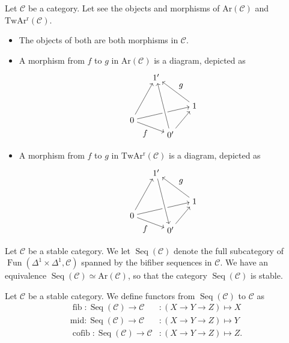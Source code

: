 \documentclass[a4paper,dvipdfmx,11pt,reqno]{amsart}
\DeclareMathOperator{\fib}{fib}
\DeclareMathOperator{\cofib}{cofib}
\renewcommand{\mid}{\mathrm{mid}}
\DeclareMathOperator{\Fun}{Fun}
\DeclareMathOperator{\Seq}{Seq}
\newcommand{\C}{\mathcal{C}}
\newcommand{\Ar}{\mathrm{Ar}}
\newcommand{\TwArr}{\mathrm{TwAr^{r}}}
\begin{document}
\begin{remark}
  Let $\C$ be a category.
  Let see the objects and morphisms of $\Ar(\C)$ and $\TwArr(\C)$.
  \begin{itemize}
    \item The objects of both are both morphisms in $\C$.
    \item A morphism from $f$ to $g$ in $\Ar(\C)$ is a diagram, depicted as 
    \[\begin{tikzpicture}[auto]
      \node (0) at (0,0) {$0$};
      \node (1) at (1.6,-0.6) {$0'$};
      \node (2) at (2.6,0.6) {$1$};
      \node (3) at (1,1.8) {$1'$};
      \draw[->] (0) -- node[swap] {$f$} (1);
      \draw[->] (0) -- node {} (2);
      \draw[->] (0) -- node {} (3);
      \draw[->] (1) -- node {} (2);
      \draw[-, line width=6pt,draw=white] (1) -- node {} (3);
      \draw[->] (1) -- node {} (3);
      \draw[->] (2) -- node[swap] {$g$} (3);
    \end{tikzpicture}\]
    \item A morphism from $f$ to $g$ in $\TwArr(\C)$ is a diagram, depicted as 
    \[\begin{tikzpicture}[auto]
      \node (0) at (0,0) {$0$};
      \node (1) at (1.6,-0.6) {$0'$};
      \node (2) at (2.6,0.6) {$1$};
      \node (3) at (1,1.8) {$1'$};
      \draw[->] (0) -- node[swap] {$f$} (1);
      \draw[->] (0) -- node {} (2);
      \draw[->] (0) -- node {} (3);
      \draw[->] (1) -- node {} (2);
      \draw[-, line width=6pt,draw=white] (1) -- node {} (3);
      \draw[->] (3) -- node {} (1);
      \draw[->] (2) -- node[swap] {$g$} (3);
    \end{tikzpicture}\]
  \end{itemize}
\end{remark}

\begin{notation} %
  Let $\C$ be a stable category.
  We let $\Seq(\C)$ denote the full subcategory of $\Fun(\Delta^1 \times \Delta^1,\C)$ spanned by the bifiber sequences in $\C$.
  We have an equivalence $\Seq(\C) \simeq \Ar(\C)$, so that the category $\Seq(\C)$ is stable.
\end{notation}

\begin{notation}
  Let $\C$ be a stable category.
  We define functors from $\Seq(\C)$ to $\C$ as 
  \begin{align*}
    \fib   : \Seq(\C) \to \C &: (X \to Y \to Z) \mapsto X \\
    \mid   : \Seq(\C) \to \C &: (X \to Y \to Z) \mapsto Y \\
    \cofib : \Seq(\C) \to \C &: (X \to Y \to Z) \mapsto Z.
  \end{align*}
\end{notation}
\end{document}
